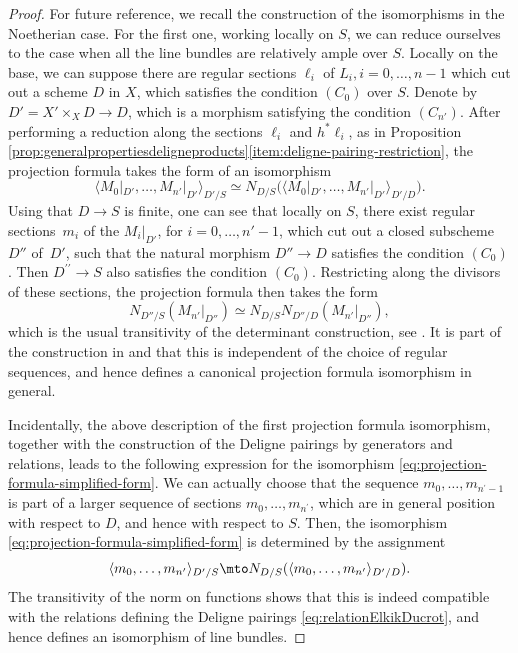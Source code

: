 \begin{proof}
For future reference, we recall the construction of the isomorphisms in the Noetherian case. For the first one, working locally on $S$, we can reduce ourselves to the case when all the line bundles are relatively ample over $S$. Locally on the base, we can suppose there are regular sections $\ell_i$ of $L_{i}, i =0,\ldots, n-1$ which cut out a scheme $D$ in $X$, which satisfies the condition $(C_0)$ over $S$. Denote by $D' = X' \times_X D \to D$, which is a morphism satisfying the condition $(C_{n'})$. After performing a reduction along the sections $\ell_i$ and $h^\ast \ell_i$, as in Proposition \ref{prop:generalpropertiesdeligneproducts}\eqref{item:deligne-pairing-restriction}, the projection formula takes the form of an isomorphism
\begin{equation}\label{eq:projection-formula-simplified-form}
\langle M_{0} |_{D'}, \ldots, M_{n'} |_{D'}\rangle_{D'/S} \simeq N_{D/S} \bigl(\langle M_{0}|_{D'}, \ldots, M_{n'}|_{D'}\rangle_{D'/D}\bigr).
\end{equation}
Using that $D \to S$ is finite, one can see that locally on $S$, there exist regular sections~$m_{i}$ of the $M_{i}|_{D'}$, for $i=0,\ldots, n'-1$, which cut out a closed subscheme $D''$ of~$D'$, such that the natural morphism $D'' \to D$ satisfies the condition $(C_0)$. Then $D^{\prime\prime}\to S$ also satisfies the condition $(C_{0})$. Restricting along the divisors of these sections, the projection formula then takes the form
\begin{displaymath}
N_{D''/S} (M_{n'}|_{D''}) \simeq N_{D/S} N_{D''/D} (M_{n'}|_{D''}),
\end{displaymath}
which is the usual transitivity of the determinant construction, see \cite[Lem.\,21.5.7.2]{EGAIV4}. It is part of the construction in \cite[\textsection IV.2]{Elkikfib} and \cite[]{Munoz} that this is independent of the choice of regular sequences, and hence defines a canonical projection formula isomorphism in general.

Incidentally, the above description of the first projection formula isomorphism, together with the construction of the Deligne pairings by generators and relations, leads to the following expression for the isomorphism \eqref{eq:projection-formula-simplified-form}. We can actually choose that the sequence $m_{0},\ldots,m_{n^{\prime}-1}$ is part of a larger sequence of sections $m_{0},\ldots,m_{n^{\prime}}$, which are in general position with respect to $D$, and hence with respect to $S$. Then, the isomorphism \eqref{eq:projection-formula-simplified-form} is determined by the assignment
\begin{displaymath}
\langle m_{0},\ldots, m_{n^{\prime}}\rangle_{D^{\prime}/S}\mto N_{D/S}(\langle m_{0},\ldots, m_{n^{\prime}}\rangle_{D^{\prime}/D}).
\end{displaymath}
The transitivity of the norm on functions shows that this is indeed compatible with the relations defining the Deligne pairings \eqref{eq:relationElkikDucrot}, and hence defines an isomorphism of line bundles.


\end{proof}
